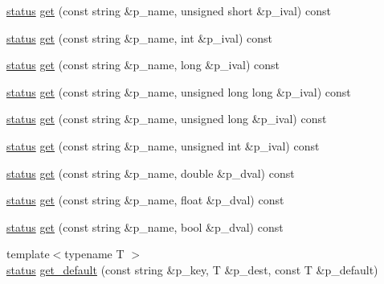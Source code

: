 \begin{DoxyCompactItemize}
\item 
\hyperlink{namespacextd_a68ed4fe8e9c11116b68efe5b102aec50}{status} \hyperlink{classxtd_1_1ConfParser_abd0bb9c9e8568c0b2dd28b133f700681}{get} (const string \&p\+\_\+name, unsigned short \&p\+\_\+ival) const 
\item 
\hyperlink{namespacextd_a68ed4fe8e9c11116b68efe5b102aec50}{status} \hyperlink{classxtd_1_1ConfParser_a902dfe3ab82e8d1710659f65fa0e853b}{get} (const string \&p\+\_\+name, int \&p\+\_\+ival) const 
\item 
\hyperlink{namespacextd_a68ed4fe8e9c11116b68efe5b102aec50}{status} \hyperlink{classxtd_1_1ConfParser_aeabbb63eeeafaf9d0853fdcf5b2a83eb}{get} (const string \&p\+\_\+name, long \&p\+\_\+ival) const 
\item 
\hyperlink{namespacextd_a68ed4fe8e9c11116b68efe5b102aec50}{status} \hyperlink{classxtd_1_1ConfParser_a38c007fd9a93cf370a9e2de14e021faf}{get} (const string \&p\+\_\+name, unsigned long long \&p\+\_\+ival) const 
\item 
\hyperlink{namespacextd_a68ed4fe8e9c11116b68efe5b102aec50}{status} \hyperlink{classxtd_1_1ConfParser_a39e678dc0205b82f4cce76533f4f4d84}{get} (const string \&p\+\_\+name, unsigned long \&p\+\_\+ival) const 
\item 
\hyperlink{namespacextd_a68ed4fe8e9c11116b68efe5b102aec50}{status} \hyperlink{classxtd_1_1ConfParser_a1e8fd9399881ef9910fd144377ff4c93}{get} (const string \&p\+\_\+name, unsigned int \&p\+\_\+ival) const 
\item 
\hyperlink{namespacextd_a68ed4fe8e9c11116b68efe5b102aec50}{status} \hyperlink{classxtd_1_1ConfParser_a6d091368a02f05c377c7d27d748b64be}{get} (const string \&p\+\_\+name, double \&p\+\_\+dval) const 
\item 
\hyperlink{namespacextd_a68ed4fe8e9c11116b68efe5b102aec50}{status} \hyperlink{classxtd_1_1ConfParser_ac0d9efc31b6b6989f4a9f6061ad03596}{get} (const string \&p\+\_\+name, float \&p\+\_\+dval) const 
\item 
\hyperlink{namespacextd_a68ed4fe8e9c11116b68efe5b102aec50}{status} \hyperlink{classxtd_1_1ConfParser_a8a8e729b8e11c5efd19dec29baa31f66}{get} (const string \&p\+\_\+name, bool \&p\+\_\+dval) const 
\item 
{\footnotesize template$<$typename T $>$ }\\\hyperlink{namespacextd_a68ed4fe8e9c11116b68efe5b102aec50}{status} \hyperlink{classxtd_1_1ConfParser_aa3a209f68c61547141194a305049eeae}{get\+\_\+default} (const string \&p\+\_\+key, T \&p\+\_\+dest, const T \&p\+\_\+default)
\item 

\end{DoxyCompactItemize}
